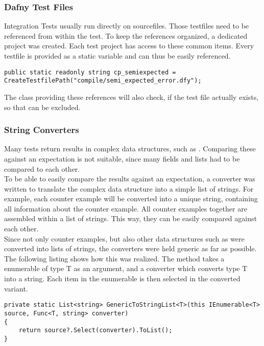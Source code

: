 \subsubsection{Dafny Test Files}
Integration Tests usually run directly on  sourcefiles. Those testfiles need to be referenced from within the test. To keep the references organized, a dedicated project  was created. Each test project has access to these common items. Every testfile is provided as a static variable and can thus be easily referenced.
\lstset{style=sharpc}
\begin{lstlisting}[caption={Test File Reference}, captionpos=b, label={lst:fileRef}]
public static readonly string cp_semiexpected = CreateTestfilePath("compile/semi_expected_error.dfy");
\end{lstlisting}
The class providing these references will also check, if the test file actually exists, so that  can be excluded.

\subsubsection{String Converters}
Many tests return results in complex data structures, such as . Comparing these against an expectation is not suitable, since many fields and lists had to be compared to each other.\\
To be able to easily compare the results against an expectation, a converter was written to translate the complex data structure into a simple list of strings. For example, each counter example will be converted into a unique string, containing all information about the counter example. All counter examples together are assembled within a list of strings. This way, they can be easily compared against each other.\\
Since not only counter examples, but also other data structures such as  were converted into lists of strings, the converters were held generic as far as possible. The following listing shows how this was realized. The method takes a enumerable of type T as an argument, and a converter which converts type T into a string. Each item in the enumerable is then selected in the converted variant.

\begin{lstlisting}[caption={Generic Method to Convert an IEnumerable}, captionpos=b, label={lst:fileRef}]
private static List<string> GenericToStringList<T>(this IEnumerable<T> source, Func<T, string> converter)
{
    return source?.Select(converter).ToList();
}
\end{lstlisting}


